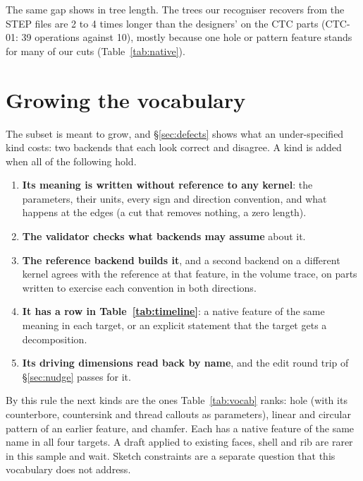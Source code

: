 \documentclass[11pt]{article}
\begin{document}
The same gap shows in tree length. The trees our recogniser recovers from the
STEP files are 2 to 4 times longer than the designers' on the CTC parts (CTC-01:
39 operations against 10), mostly because one hole or pattern feature stands for
many of our cuts (Table~\ref{tab:native}).

\section{Growing the vocabulary}\label{sec:grow}

The subset is meant to grow, and \S\ref{sec:defects} shows what an
under-specified kind costs: two backends that each look correct and disagree. A
kind is added when all of the following hold.

\begin{enumerate}
\item \textbf{Its meaning is written without reference to any kernel}: the
  parameters, their units, every sign and direction convention, and what happens
  at the edges (a cut that removes nothing, a zero length).
\item \textbf{The validator checks what backends may assume} about it.
\item \textbf{The reference backend builds it}, and a second backend on a
  different kernel agrees with the reference at that feature, in the volume
  trace, on parts written to exercise each convention in both directions.
\item \textbf{It has a row in Table~\ref{tab:timeline}}: a native feature of the
  same meaning in each target, or an explicit statement that the target gets a
  decomposition.
\item \textbf{Its driving dimensions read back by name}, and the edit round trip
  of \S\ref{sec:nudge} passes for it.
\end{enumerate}

By this rule the next kinds are the ones Table~\ref{tab:vocab} ranks: hole (with
its counterbore, countersink and thread callouts as parameters), linear and
circular pattern of an earlier feature, and chamfer. Each has a native feature of
the same name in all four targets. A draft applied to existing faces, shell and
rib are rarer in this sample and wait. Sketch constraints are a separate
question that this vocabulary does not address.

\end{document}
